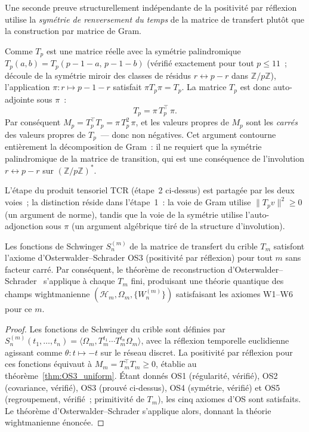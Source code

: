 \documentclass[12pt,a4paper]{article}
\begin{document}
\begin{remarque}
\label{rem:OS3_symmetry}
Une seconde preuve structurellement indépendante de la positivité
par réflexion utilise la \emph{symétrie de renversement du temps}
de la matrice de transfert plutôt que la construction par matrice
de Gram.

Comme $T_p$ est une matrice réelle avec la symétrie palindromique
$T_p(a,b) = T_p(p{-}1{-}a,\, p{-}1{-}b)$ (vérifié exactement pour
tout $p \leq 11$~; découle de la symétrie miroir des classes de
résidus $r \leftrightarrow p - r$ dans $\mathbb{Z}/p\mathbb{Z}$),
l'application $\pi: r \mapsto p - 1 - r$ satisfait
$\pi T_p \pi = T_p$. La matrice $T_p$ est donc auto-adjointe sous
$\pi$~:
\[
  T_p = \pi\, T_p^{\!\top}\, \pi.
\]
Par conséquent $M_p = T_p^{\!\top} T_p = \pi\, T_p^2\, \pi$, et
les valeurs propres de $M_p$ sont les \emph{carrés} des valeurs
propres de $T_p$~--- donc non négatives. Cet argument contourne
entièrement la décomposition de Gram~: il ne requiert que la
symétrie palindromique de la matrice de transition, qui est une
conséquence de l'involution $r \leftrightarrow p-r$ sur
$(\mathbb{Z}/p\mathbb{Z})^*$.

L'étape du produit tensoriel TCR (étape~2 ci-dessus) est partagée
par les deux voies~; la distinction réside dans l'étape~1~: la
voie de Gram utilise $\|T_p v\|^2 \geq 0$ (un argument de norme),
tandis que la voie de la symétrie utilise l'auto-adjonction sous
$\pi$ (un argument algébrique tiré de la structure d'involution).
\end{remarque}

\begin{corollaire}
\label{cor:OS3_reconstruction}
\mBR
Les fonctions de Schwinger $S_n^{(m)}$ de la matrice de transfert
du crible $T_m$ satisfont l'axiome d'Osterwalder--Schrader OS3
(positivité par réflexion) pour tout $m$ sans facteur carré. Par
conséquent, le théorème de reconstruction
d'Osterwalder--Schrader~\cite{OsterwalderSchrader1973,OsterwalderSchrader1975}
s'applique à chaque $T_m$ fini, produisant une théorie quantique
des champs wightmanienne
$(\mathcal{H}_m, \Omega_m, \{W_n^{(m)}\})$ satisfaisant les
axiomes W1--W6 pour ce $m$.
\end{corollaire}

\begin{proof}
Les fonctions de Schwinger du crible sont définies par
$S_n^{(m)}(t_1,\ldots,t_n) = \langle \Omega_m, T_m^{t_1} \cdots
T_m^{t_n} \Omega_m \rangle$, avec la réflexion temporelle
euclidienne agissant comme $\theta\colon t \mapsto -t$ sur le
réseau discret. La positivité par réflexion pour ces fonctions
équivaut à $M_m = T_m^{\!\top} T_m \geq 0$, établie au
théorème~\ref{thm:OS3_uniform}. Étant donnés OS1 (régularité,
vérifié), OS2 (covariance, vérifié), OS3 (prouvé ci-dessus), OS4
(symétrie, vérifié) et OS5 (regroupement, vérifié~; primitivité
de $T_m$), les cinq axiomes d'OS sont satisfaits. Le théorème
d'Osterwalder--Schrader s'applique alors, donnant la théorie
wightmanienne énoncée.
\end{proof}
\end{document}
